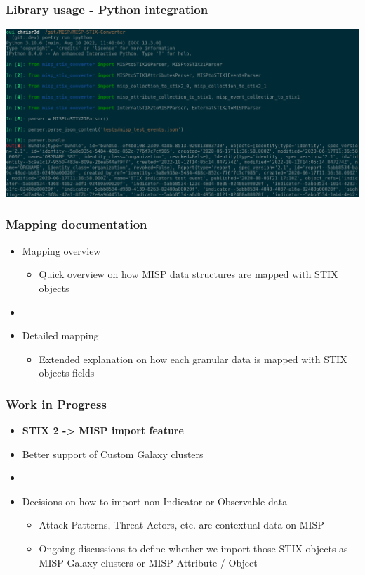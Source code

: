 \begin{frame}
    \frametitle{Library usage - Python integration}
    \centering
    \includegraphics[scale=0.12]{images/python_usage.png}
\end{frame}

\begin{frame}
    \frametitle{Mapping documentation}
    \begin{itemize}
        \item Mapping overview
        \begin{itemize}
            \item Quick overview on how MISP data structures are mapped with STIX objects
        \end{itemize}
        \item []
        \item Detailed mapping
        \begin{itemize}
            \item Extended explanation on how each granular data is mapped with STIX objects fields
        \end{itemize}
    \end{itemize}
\end{frame}

\begin{frame}
    \frametitle{Work in Progress}
    \begin{itemize}
        \item {\bf STIX 2 -> MISP import feature}
        \item Better support of Custom Galaxy clusters
        \item []
        \item Decisions on how to import non Indicator or Observable data
        \begin{itemize}
            \item Attack Patterns, Threat Actors, etc. are contextual data on MISP
            \item Ongoing discussions to define whether we import those STIX objects as MISP Galaxy clusters or MISP Attribute / Object
        \end{itemize}
    \end{itemize}
\end{frame}

